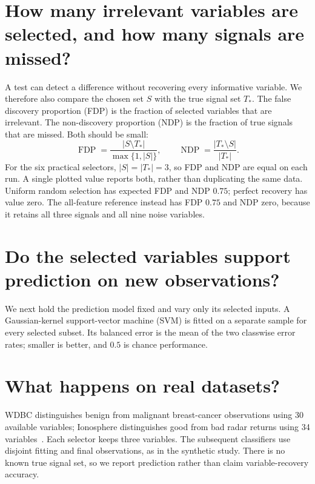\documentclass[11pt,a4paper]{article}
\begin{document}
\section{How many irrelevant variables are selected, and how many signals are missed?}\label{sec:recovery}
A test can detect a difference without recovering every informative variable.
We therefore also compare the chosen set $S$ with the true signal set $T_*$.
The false discovery proportion (FDP) is the fraction of selected variables that
are irrelevant. The non-discovery proportion (NDP) is the fraction of true
signals that are missed. Both should be small:
\begin{equation}\label{eq:recovery}
\operatorname{FDP}=\frac{|S\setminus T_*|}{\max\{1,|S|\}},\qquad
\operatorname{NDP}=\frac{|T_*\setminus S|}{|T_*|}.
\end{equation}
For the six practical selectors, $|S|=|T_*|=3$, so FDP and NDP are equal on
each run. A single plotted value reports both, rather than duplicating the same
data. Uniform random selection has expected FDP and NDP $0.75$; perfect recovery
has value zero. The all-feature reference instead has FDP $0.75$ and NDP zero,
because it retains all three signals and all nine noise variables.

\FloatBarrier
\section{Do the selected variables support prediction on new observations?}\label{sec:prediction}
We next hold the prediction model fixed and vary only its selected inputs.
A Gaussian-kernel support-vector machine (SVM) is fitted on a separate sample
for every selected subset. Its balanced error is the mean of the two classwise
error rates; smaller is better, and $0.5$ is chance performance.

\FloatBarrier
\section{What happens on real datasets?}\label{sec:real}
WDBC distinguishes benign from malignant breast-cancer observations using
30 available variables; Ionosphere distinguishes good from bad radar returns
using 34 variables~\cite{wdbc,ionosphere}. Each selector keeps three variables.
The subsequent classifiers use disjoint fitting and final observations, as in
the synthetic study. There is no known true signal set, so we report prediction
rather than claim variable-recovery accuracy.
\end{document}

